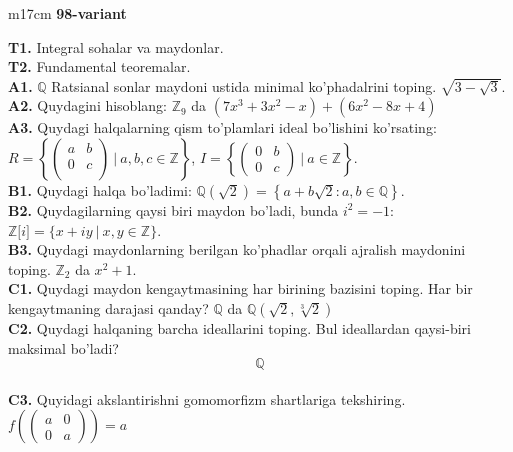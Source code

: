 \documentclass{article}
\begin{document}
\begin{tabular}{m{17cm}}
\textbf{98-variant}
\newline

\textbf{T1.} Integral sohalar va maydonlar. \\
\textbf{T2.} Fundamental teoremalar. \\
\textbf{A1.} \(\mathbb{Q}\) Ratsianal sonlar maydoni ustida minimal ko'phadalrini toping.
\(\sqrt{3 - \sqrt{3}}\). \\
\textbf{A2.} Quydagini hisoblang:
\(\mathbb{Z}_{9}\) da \(\left( 7x^{3} + 3x^{2} - x \right) + \left( 6x^{2} - 8x + 4 \right)\) \\
\textbf{A3.} Quydagi halqalarning qism to'plamlari ideal bo'lishini ko'rsating: \(R = \left\{ \begin{pmatrix}
a & b \\
0 & c \\
 & 
\end{pmatrix}\ |\ a,b,c \in \mathbb{Z} \right\}\), \(I = \left\{ \begin{pmatrix}
0 & b \\
0 & c
\end{pmatrix}\ |\ a \in \mathbb{Z} \right\}\). \\
\textbf{B1.} Quydagi halqa bo'ladimi:
\(\mathbb{Q}\left( \sqrt{2} \right) = \left\{ a + b\sqrt{2}:a,b \in \mathbb{Q} \right\}\). \\
\textbf{B2.} Quydagilarning qaysi biri maydon bo'ladi, bunda \(i^{2} = - 1\):
\(\mathbb{Z\lbrack}i\rbrack = \{ x + iy\ |\ x,y \in \mathbb{Z\}}\). \\
\textbf{B3.} Quydagi maydonlarning berilgan ko'phadlar orqali ajralish maydonini toping.
\(\mathbb{Z}_{2}\) da \(x^{2} + 1\). \\
\textbf{C1.} Quydagi maydon kengaytmasining har birining bazisini toping. Har bir kengaytmaning darajasi qanday?
\(\mathbb{Q}\) da \(\mathbb{Q}\left( \sqrt{2},\sqrt[3]{2} \right)\) \\
\textbf{C2.} Quydagi halqaning barcha ideallarini toping. Bul ideallardan qaysi-biri maksimal bo'ladi?
\[\mathbb{Q}\] \\
\textbf{C3.} Quyidagi akslantirishni gomomorfizm shartlariga tekshiring. \(f\left( \begin{pmatrix}
a & 0 \\
0 & a
\end{pmatrix} \right) = a\) \\

\end{tabular}
\vspace{1cm}
\end{document}
